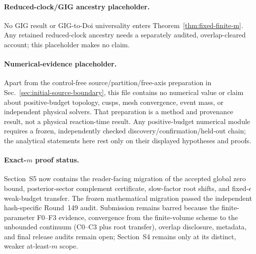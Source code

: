 \documentclass[aps,physrev,onecolumn,amsmath,amssymb,longbibliography]{revtex4-2}
\begin{document}
\paragraph{Reduced-clock/GIG ancestry placeholder.}
No GIG result or GIG-to-Doi universality enters
Theorem~\ref{thm:fixed-finite-m}.  Any retained reduced-clock ancestry needs a
separately audited, overlap-cleared account; this placeholder makes no claim.

\paragraph{Numerical-evidence placeholder.}
Apart from the control-free source/partition/free-axis preparation in
Sec.~\ref{sec:initial-source-boundary}, this file contains no numerical value
or claim about positive-budget topology, cusps, mesh convergence, event mass,
or independent physical solvers.  That preparation is a method and provenance
result, not a physical reaction-time result.  Any positive-budget numerical
module requires a frozen, independently checked discovery/confirmation/held-out
chain; the analytical statements here rest only on their displayed hypotheses
and proofs.

\paragraph{Exact-\(m\) proof status.}
Section~S5 now contains the reader-facing migration of the accepted global
zero bound, posterior-sector complement certificate, slow-factor root shifts,
and fixed-\(\epsilon\) weak-budget transfer.  The frozen mathematical migration
passed the independent hash-specific Round~149 audit.  Submission remains
barred because the finite-parameter F0--F3 evidence, convergence from the
finite-volume scheme to the unbounded continuum (C0--C3 plus root transfer),
overlap disclosure, metadata, and final release audits remain open;
Section~S4 remains only at its distinct, weaker at-least-\(m\) scope.


\end{document}
